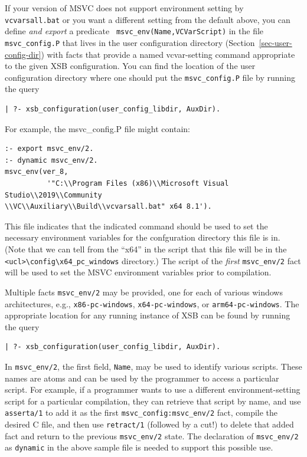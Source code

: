 If your version of MSVC does not support environment setting by {\tt
  vcvarsall.bat} or you want a different setting from the default
above, you can define {\em and export} a predicate {\tt
  msvc\_env(Name,VCVarScript)} in the file \texttt{msvc\_config.P}
that lives in the user configuration directory
(Section~\ref{sec-user-config-dir}) with facts that provide a named
vcvar-setting command appropriate to the given XSB configuration.  You
can find the location of the user configuration directory where one
should put the {\tt msvc\_config.P} file by running the query
\begin{verbatim}
| ?- xsb_configuration(user_config_libdir, AuxDir).
\end{verbatim}
For example, the msvc\_config.P file might contain:
\begin{verbatim}
:- export msvc_env/2.
:- dynamic msvc_env/2.
msvc_env(ver_8,
          '"C:\\Program Files (x86)\\Microsoft Visual Studio\\2019\\Community
\\VC\\Auxiliary\\Build\\vcvarsall.bat" x64 8.1').
\end{verbatim}
This file indicates that the indicated command should be used to set
the necessary environment variables for the confguration directory
this file is in.  (Note that we can tell from the ``x64'' in the
script that this file will be in the
\verb|<ucl>\config\x64_pc_windows| directory.)  The script of the {\em
  first} {\tt msvc\_env/2} fact will be used to set the MSVC
environment variables prior to compilation.

Multiple facts {\tt msvc\_env/2} may be provided, one for each
of various windows architectures, e.g., \texttt{x86-pc-windows},
\texttt{x64-pc-windows}, or \texttt{arm64-pc-windows}.
The appropriate location for any running instance of XSB can be found by
running the query
\begin{verbatim}
| ?- xsb_configuration(user_config_libdir, AuxDir).
\end{verbatim}
In \texttt{msvc\_env/2}, the  first field, {\tt Name},
may be used to identify various scripts.  These
names are atoms and can be used by the programmer to access a
particular script.  For example, if a programmer wants to use a
different environment-setting script for a particular compilation,
they can retrieve that script by name, and use {\tt asserta/1} to add
it as the first {\tt msvc\_config:msvc\_env/2} fact, compile the
desired C file, and then use {\tt retract/1} (followed by a cut!) to
delete that added fact and return to the previous {\tt msvc\_env/2}
state.  The declaration of {\tt msvc\_env/2} as {\tt dynamic} in the
above sample file is needed to support this possible use.


